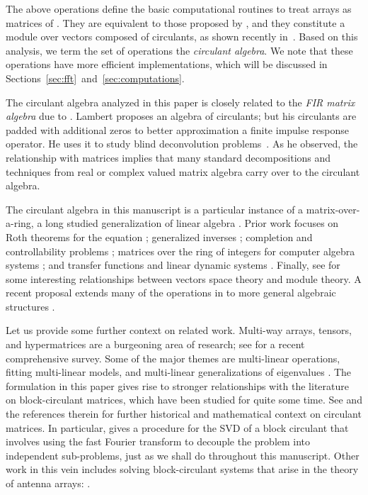 \documentclass[1p,authoryear,letterpaper]{elsarticle}
\renewcommand{\cite}{\citep}
\begin{document}
The above operations define the basic computational routines to treat 
  arrays as  matrices of .  
They are equivalent to those proposed by \citet{kilmer2008-circ-tensor-svd}, 
and they constitute a module over vectors composed of circulants, as 
shown recently in~\citet{braman201x-tensor-eigenvalues}.  Based on this 
analysis, we term the set of operations the \emph{circulant algebra}.  
We note that these operations have more efficient implementations,
which will be discussed in Sections~\ref{sec:fft}~and~\ref{sec:computations}.

The circulant algebra analyzed in this paper is closely related to the
\emph{FIR matrix algebra} due to
\citet[Chapter 3]{lambert1996-thesis}.
Lambert proposes an algebra
of circulants; but his circulants are
padded with additional zeros to better
approximation a finite impulse response
operator.  He uses it to study
blind deconvolution problems~\cite{lambert2001-polynomials-svd}.
As he observed, the relationship with matrices implies that many
standard decompositions and techniques from real or complex
valued matrix algebra carry over to the circulant algebra.

The circulant algebra in this
manuscript is a particular instance of a matrix-over-a-ring,
a long studied generalization of linear algebra
\cite{McDonald1984-ring-algebra, brewer1986-linear-systems}.
Prior work focuses on
Roth theorems for the
equation  \cite{Gustafson1979-Roth-theorems}; generalized inverses
\cite{Prasad1994-generalized}; completion and
controllability problems \cite{Gurvits1992-controllability};
matrices over the ring of integers for
computer algebra systems \cite{Hafner1991-matrices-over-rings};
and transfer functions and linear dynamic systems \cite{Sontag1976-ring-systems}.
Finally, see \citet{Gustafson1991-modules-and-matrices} for some interesting relationships between vectors space
theory and module theory.
A recent proposal extends many of
the operations in \citet{kilmer2008-circ-tensor-svd}
to more general algebraic structures \cite{Navasca2010-modules}.

Let us provide some further context on related work.
Multi-way arrays, tensors, and hypermatrices
are a burgeoning area of research;
see \citet{kolda2009-tensor-decompositions}
for a recent  comprehensive survey.  Some
of the major themes are multi-linear
operations, fitting multi-linear
models, and multi-linear generalizations
of eigenvalues \cite{Qi2007-tensor-eigenvalues}.
The formulation in this paper gives rise to stronger
relationships with the literature
on block-circulant matrices,
which have
been studied for quite some time.
See \citet{tee2005-block-circulant} and the references therein 
for further historical and mathematical context on circulant matrices.
In particular, \citet{baker1989-block-circulant-svd} gives a procedure
for the SVD of a block circulant that involves using
the fast Fourier transform to decouple
the problem into independent sub-problems, just
as we shall do throughout this manuscript.
Other work in this vein includes solving
block-circulant systems that arise in
the theory of antenna arrays: \cite{sinott1973-antenna-arrays,mazancourt1983-block-circulant,vescovo1997-block-circulant}.
\end{document}
